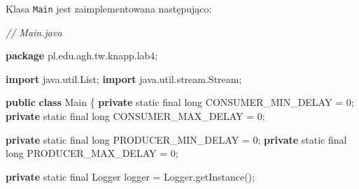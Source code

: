 \documentclass[11pt]{article}
\newenvironment{Shaded}{}{}
\newcommand{\KeywordTok}[1]{\textcolor[rgb]{0.00,0.44,0.13}{\textbf{{#1}}}}
\newcommand{\DataTypeTok}[1]{\textcolor[rgb]{0.56,0.13,0.00}{{#1}}}
\newcommand{\DecValTok}[1]{\textcolor[rgb]{0.25,0.63,0.44}{{#1}}}
\newcommand{\CommentTok}[1]{\textcolor[rgb]{0.38,0.63,0.69}{\textit{{#1}}}}
\newcommand{\FunctionTok}[1]{\textcolor[rgb]{0.02,0.16,0.49}{{#1}}}
\newcommand{\NormalTok}[1]{{#1}}
\newcommand{\ImportTok}[1]{{#1}}
\newcommand{\OperatorTok}[1]{\textcolor[rgb]{0.40,0.40,0.40}{{#1}}}
\newcommand{\BuiltInTok}[1]{{#1}}
\begin{document}
Klasa \texttt{Main} jest zaimplementowana następująco:

\begin{Shaded}
\begin{Highlighting}[]
\CommentTok{// Main.java}

\KeywordTok{package}\ImportTok{ pl}\OperatorTok{.}\ImportTok{edu}\OperatorTok{.}\ImportTok{agh}\OperatorTok{.}\ImportTok{tw}\OperatorTok{.}\ImportTok{knapp}\OperatorTok{.}\ImportTok{lab4}\OperatorTok{;}

\KeywordTok{import} \ImportTok{java}\OperatorTok{.}\ImportTok{util}\OperatorTok{.}\ImportTok{List}\OperatorTok{;}
\KeywordTok{import} \ImportTok{java}\OperatorTok{.}\ImportTok{util}\OperatorTok{.}\ImportTok{stream}\OperatorTok{.}\ImportTok{Stream}\OperatorTok{;}

\KeywordTok{public} \KeywordTok{class}\NormalTok{ Main }\OperatorTok{\{}
    \KeywordTok{private} \DataTypeTok{static} \DataTypeTok{final} \DataTypeTok{long}\NormalTok{ CONSUMER\_MIN\_DELAY }\OperatorTok{=} \DecValTok{0}\OperatorTok{;}
    \KeywordTok{private} \DataTypeTok{static} \DataTypeTok{final} \DataTypeTok{long}\NormalTok{ CONSUMER\_MAX\_DELAY }\OperatorTok{=} \DecValTok{0}\OperatorTok{;}

    \KeywordTok{private} \DataTypeTok{static} \DataTypeTok{final} \DataTypeTok{long}\NormalTok{ PRODUCER\_MIN\_DELAY }\OperatorTok{=} \DecValTok{0}\OperatorTok{;}
    \KeywordTok{private} \DataTypeTok{static} \DataTypeTok{final} \DataTypeTok{long}\NormalTok{ PRODUCER\_MAX\_DELAY }\OperatorTok{=} \DecValTok{0}\OperatorTok{;}

    \KeywordTok{private} \DataTypeTok{static} \DataTypeTok{final} \BuiltInTok{Logger}\NormalTok{ logger }\OperatorTok{=} \BuiltInTok{Logger}\OperatorTok{.}\FunctionTok{getInstance}\OperatorTok{();}


\end{Highlighting}
\end{Shaded}
\end{document}

